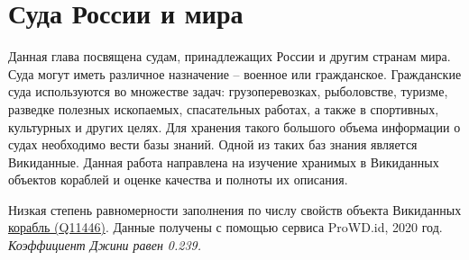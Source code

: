\chapter{Суда России и мира}
\label{ch:ships-chapter}

Данная глава посвящена судам, принадлежащих России и другим странам мира. Суда могут иметь различное назначение -- военное или гражданское. Гражданские суда используются во множестве задач: грузоперевозках, рыболовстве, туризме, разведке полезных ископаемых, спасательных работах, а также в спортивных, культурных и других целях. Для хранения такого большого объема информации о судах необходимо вести базы знаний. Одной из таких баз знания является Викиданные. Данная работа направлена на изучение хранимых в Викиданных объектов кораблей и оценке качества и полноты их описания.

\begin{marginfigure}[0.0cm]
    {
    \setlength{\fboxsep}{0pt}%
    \setlength{\fboxrule}{1pt}%
    }
      \caption{Низкая степень равномерности заполнения по числу свойств объекта Викиданных 
                    \href{https://www.wikidata.org/wiki/Q11446}{корабль (Q11446)}. 
                    Данные получены с помощью сервиса ProWD.id, 2020 год.
                    \emph{Коэффициент Джини равен 0.239.}}%
      \label{fig:prowd_ships-unbalanced}%
    \end{marginfigure}